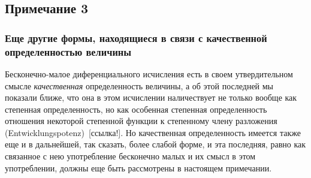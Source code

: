 {\bigskip

\subsection*{Примечание 3}
\subsubsection*{Еще другие формы, находящиеся в связи с качественной определенностью
величины}

Бесконечно-малое диференциального исчисления есть в своем утвердительном
смысле {\em качественная} определенность величины, а об
этой последней мы показали ближе, что она в этом исчислении наличествует не
только вообще как степенная определенность, но как особенная степенная
определенность отношения некоторой степенной функции к степенному члену
разложения (Entwicklungspotenz)~[ссылка!]. Но качественная определенность
имеется также еще и в дальнейшей, так сказать, более слабой форме, и эта
последняя, равно как связанное с нею употребление бесконечно малых и их
смысл в этом употреблении, должны еще быть рассмотрены в настоящем
примечании.

}
